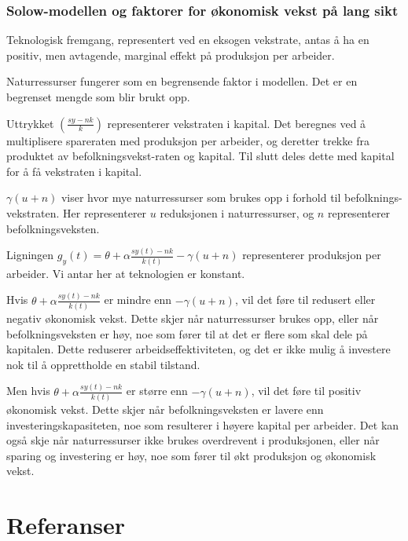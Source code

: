 \documentclass[
  12pt,
  a4paper,
  DIV=11,
  numbers=noendperiod]{scrartcl}
\begin{document}
\subsubsection{Solow-modellen og faktorer for økonomisk vekst på lang
sikt}\label{solow-modellen-og-faktorer-for-uxf8konomisk-vekst-puxe5-lang-sikt}

Teknologisk fremgang, representert ved en eksogen vekstrate, antas å ha
en positiv, men avtagende, marginal effekt på produksjon per arbeider.

Naturressurser fungerer som en begrensende faktor i modellen. Det er en
begrenset mengde som blir brukt opp.

Uttrykket \(\left(\frac{sy-nk}{k}\right)\) representerer vekstraten i
kapital. Det beregnes ved å multiplisere spareraten med produksjon per
arbeider, og deretter trekke fra produktet av befolkningsvekst-raten og
kapital. Til slutt deles dette med kapital for å få vekstraten i
kapital.

\(\gamma (u+n)\) viser hvor mye naturressurser som brukes opp i forhold
til befolknings-vekstraten. Her representerer \(u\) reduksjonen i
naturressurser, og \(n\) representerer befolkningsveksten.

Ligningen
\(g_y(t) = \theta+ \alpha \frac{sy(t) -nk}{k(t)} - \gamma(u+n)\)
representerer produksjon per arbeider. Vi antar her at teknologien er
konstant.

Hvis \(\theta+ \alpha \frac{sy(t) -nk}{k(t)}\) er mindre enn
\(-\gamma(u+n)\), vil det føre til redusert eller negativ økonomisk
vekst. Dette skjer når naturressurser brukes opp, eller når
befolkningsveksten er høy, noe som fører til at det er flere som skal
dele på kapitalen. Dette reduserer arbeidseffektiviteten, og det er ikke
mulig å investere nok til å opprettholde en stabil tilstand.

Men hvis \(\theta+ \alpha \frac{sy(t) -nk}{k(t)}\) er større enn
\(-\gamma(u+n)\), vil det føre til positiv økonomisk vekst. Dette skjer
når befolkningsveksten er lavere enn investeringskapasiteten, noe som
resulterer i høyere kapital per arbeider. Det kan også skje når
naturressurser ikke brukes overdrevent i produksjonen, eller når sparing
og investering er høy, noe som fører til økt produksjon og økonomisk
vekst.

\clearpage

\section{Referanser}\label{referanser}
\end{document}

